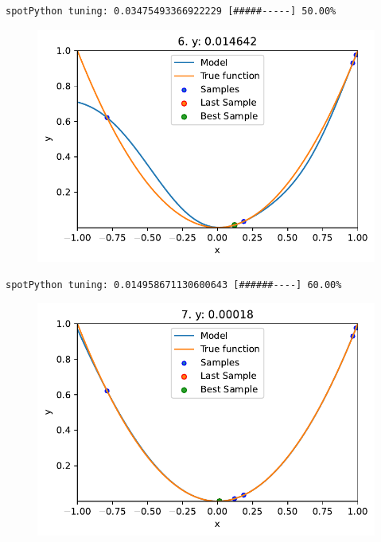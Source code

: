 \documentclass[
  letterpaper,
  DIV=11,
  numbers=noendperiod]{scrreprt}
\begin{document}
\begin{verbatim}
spotPython tuning: 0.03475493366922229 [#####-----] 50.00% 
\end{verbatim}

\begin{figure}[H]

{\centering \includegraphics{04_spot_sklearn_surrogate_files/figure-pdf/cell-21-output-6.pdf}

}

\end{figure}

\begin{verbatim}
spotPython tuning: 0.014958671130600643 [######----] 60.00% 
\end{verbatim}

\begin{figure}[H]

{\centering \includegraphics{04_spot_sklearn_surrogate_files/figure-pdf/cell-21-output-8.pdf}

}

\end{figure}
\end{document}
